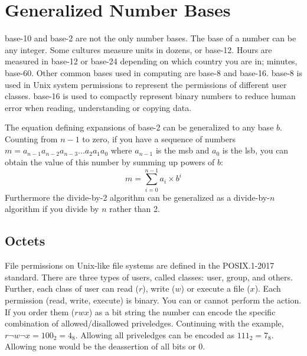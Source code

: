 \section{Generalized Number Bases\label{sec:numbers:bases}}

\Gls{base-10} and \gls{base-2} are not the only number bases. The base of a number can be any 
integer. Some cultures measure units in dozens, or base-12. Hours are measured in base-12 or 
base-24 depending on which country you are in; minutes, base-60. Other common bases used in computing are \gls{base-8} and 
\gls{base-16}. \Gls{base-8} is used in Unix system permissions to represent the permissions of
different user classes. \Gls{base-16} is used to compactly represent binary numbers to 
reduce human error when reading, understanding or copying data.

The equation defining expansions of \gls{base-2} can be generalized to any base $b$. Counting from $n-1$ 
to zero, if you have a sequence of numbers $m = a_{n-1}a_{n-2}a_{n-3}...a_2a_1a_0$ 
where $a_{n-1}$ is the \gls{msb} and $a_0$ is the \gls{lsb}, you can obtain the value of this number 
by summing up powers of $b$:
%
\begin{equation}\label{eq:basen}
    m = \sum_{i=0}^{n-1} a_i \times b^i
\end{equation}
%
Furthermore the divide-by-2 algorithm can be generalized as a divide-by-$n$ algorithm if you divide by $n$ rather than 2.

\begin{figure}[h]
\end{figure}

\subsection{Octets}

File permissions on Unix-like file systems are defined in the POSIX.1-2017 standard. There 
are three types of users, called classes: user, group, and others. Further, each class of user can 
read ($r$), write ($w$) or execute a file ($x$). Each permission (read, write, execute) is binary. 
You can or cannot perform the action. If you order them ($rwx$) as a bit string the number can 
encode the specific combination of allowed/disallowed priveledges. Continuing with the example, 
$r\neg w \neg x = 100_2 = 4_{8}$. Allowing all priveledges can be encoded 
as $111_2 = 7_{8}$.  Allowing none would be the deassertion of all bits or $0$.


